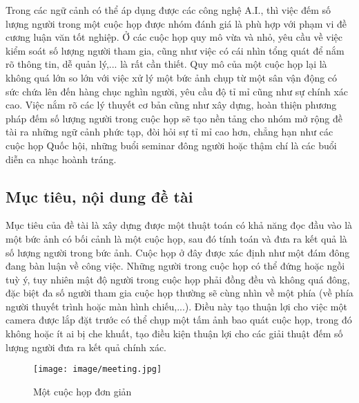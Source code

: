 \documentclass[12pt,a4paper]{article}
\begin{document}
Trong các ngữ cảnh có thể áp dụng được các công nghệ A.I., thì việc đếm số lượng người trong một cuộc họp được nhóm đánh giá là phù hợp với phạm vi đề cương luận văn tốt nghiệp. Ở các cuộc họp quy mô vừa và nhỏ, yêu cầu về việc kiểm soát số lượng người tham gia, cũng như việc có cái nhìn tổng quát để nắm rõ thông tin, dễ quản lý,... là rất cần thiết. Quy mô của một cuộc họp lại là không quá lớn so lớn với việc xử lý một bức ảnh chụp từ một sân vận động có sức chứa lên đến hàng chục nghìn người, yêu cầu độ tỉ mỉ cũng như sự chính xác cao. Việc nắm rõ các lý thuyết cơ bản cũng như xây dựng, hoàn thiện phương pháp đếm số lượng người trong cuộc họp sẽ tạo nền tảng cho nhóm mở rộng đề tài ra những ngữ cảnh phức tạp, đòi hỏi sự tỉ mỉ cao hơn, chẳng hạn như các cuộc họp Quốc hội, những buổi seminar đông người hoặc thậm chí là các buổi diễn ca nhạc hoành tráng.
\newpage

		\subsection{Mục tiêu, nội dung đề tài}
Mục tiêu của đề tài là xây dựng được một thuật toán có khả năng đọc đầu vào là một bức ảnh có bối cảnh là một cuộc họp, sau đó tính toán và đưa ra kết quả là số lượng người trong bức ảnh. Cuộc họp ở đây được xác định như một đám đông đang bàn luận về công việc. Những người trong cuộc họp có thể đứng hoặc ngồi tuỳ ý, tuy nhiên mật độ người trong cuộc họp phải đồng đều và không quá đông, đặc biệt đa số người tham gia cuộc họp thường sẽ cùng nhìn về một phía (về phía người thuyết trình hoặc màn hình chiếu,...). Điều này tạo thuận lợi cho việc một camera được lắp đặt trước có thể chụp một tấm ảnh bao quát cuộc họp, trong đó không hoặc ít ai bị che khuất, tạo điều kiện thuận lợi cho các giải thuật đếm số lượng người đưa ra kết quả chính xác.

    \begin{figure}[H]
        \centering
        \texttt{[image: image/meeting.jpg]}
        \caption{Một cuộc họp đơn giản \cite{DataSet}}
        \label{fig:my_label}
    \end{figure}
\end{document}

